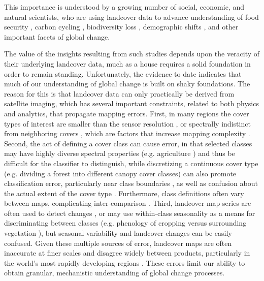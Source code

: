 \documentclass[a4paper]{article}
\begin{document}
This importance is understood by a growing number of social, economic, and natural scientists, who are using landcover data to advance understanding of food security \citep{lark_cropland_2015,wright_recent_2013, licker_mind_2010}, carbon cycling \citep{asner_high-resolution_2010, gaveau_major_2014}, biodiversity loss \citep{newbold_global_2015, luoto_predicting_2004}, demographic shifts \citep{linard_assessing_2010}, and other important facets of global change. 

The value of the insights resulting from such studies depends upon the veracity of their underlying landcover data, much as a house requires a solid foundation in order to remain standing. Unfortunately, the evidence to date indicates that much of our understanding of global change is built on shaky foundations. The reason for this is that landcover data can only practically be derived from satellite imaging, which has several important constraints, related to both physics and analytics, that propagate mapping errors. First, in many regions the cover types of interest are smaller than the sensor resolution \citep[e.g. smallholder's farms][]{jain_mapping_2013,debats_generalized_2016,ozdogan_resolution_2006}, or spectrally indistinct from neighboring covers \citep{sweeney_mapping_2015}, which are factors that increase mapping complexity \citep{yu_meta-discoveries_2014}. Second, the act of defining a cover class can cause error, in that selected classes may have highly diverse spectral properties (e.g. agriculture \citep{debats_generalized_2016,estes_platform_2015}) and thus be difficult for the classifier to distinguish, while discretizing a continuous cover type (e.g. dividing a forest into different canopy cover classes) can also promote classification error, particularly near class boundaries \citep{foody_status_2002}, as well as confusion about the actual extent of the cover type \citep{sexton_conservation_2015}. Furthermore, class definitions often vary between maps, complicating inter-comparison \citep{kuemmerle_challenges_2013}. Third, landcover map series are often used to detect changes \citep[e.g.][]{gross_monitoring_2013}, or may use within-class seasonality as a means for discriminating between classes (e.g. phenology of cropping versus surrounding vegetation \citep{sweeney_mapping_2015}), but seasonal variability and landcover changes can be easily confused. Given these multiple sources of error, landcover maps are often inaccurate at finer scales and disagree widely between products, particularly in the world's most rapidly developing regions \citep{estes_projected_2013, fritz_comparison_2010, fritz_cropland_2011}. These errors limit our ability to obtain granular, mechanistic understanding of global change processes. 
\end{document}
